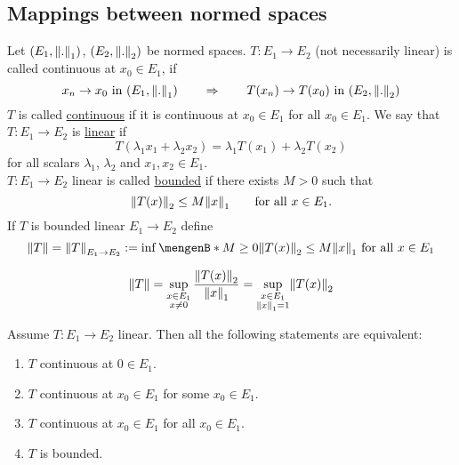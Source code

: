 \subsection{Mappings between normed spaces} 
\label{sub:mappings_between_normed_spaces}
\begin{definition*}
	Let $(E_1,\norm{.}_1)$, $(E_2,\norm{.}_2)$ be normed spaces. $T: E_1 \to E_2$ (not necessarily linear) is called continuous at $x_0 \in E_1$, if 
	\[
		x_n \to x_0 \text{ in } (E_1,\norm{.}_1) \qquad \Rightarrow \qquad T(x_n) \to T(x_0) \text{ in } (E_2,\norm{.}_2)
	\]
	$T$ is called \underline{continuous} if it is continuous at $x_0 \in E_1$ for all $x_0 \in E_1$. We say that $T: E_1 \to E_2$ is \underline{linear} if 
	\[
		T(\lambda_1 x_1 + \lambda_2 x_2) = \lambda_1 T(x_1) + \lambda_2 T(x_2)
	\]
	for all scalars $\lambda_1$, $\lambda_2$ and $x_1,x_2 \in E_1$. \\
	$T: E_1 \to E_2$ linear is called \underline{bounded} if there exists $M>0$ such that
	\[
		\norm{T(x)}_2 \leq M \norm{x}_1 \qquad \text{for all }x \in E_1.
	\]If $T$ is bounded linear $E_1 \to E_2$ define
	\[
		\norm{T} = \norm{T}_{E_1 \to E_2} := \inf \set[M \geq 0]{\norm{T(x)}_2 \leq M \norm{x}_1 \text{ for all }x \in E_1}
	\]
\end{definition*}
\begin{lemma*}
	\[
		\norm{T} = \sup\limits_{\substack{x \in E_1 \\ x \neq 0}} \frac{\norm{T(x)}_2}{\norm{x}_1} = \sup\limits_{\substack{x \in E_1 \\ \norm{x}_1=1}} \norm{T(x)}_2
	\]
\end{lemma*}
\begin{proposition}
	Assume $T: E_1 \to E_2$ linear. Then all the following statements are equivalent:
	\begin{enumerate}[(1)]
		\item $T$ continuous at $0 \in E_1$.
		\item $T$ continuous at $x_0 \in E_1$ for some $x_0 \in E_1$.
		\item $T$ continuous at $x_0 \in E_1$ for all $x_0 \in E_1$.
		\item $T$ is bounded.
	\end{enumerate}
\end{proposition}
